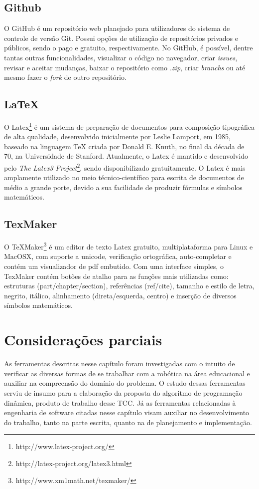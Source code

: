 \subsection{Github}
O GitHub é um repositório web planejado para utilizadores do sistema de controle de versão Git. Possui opções de utilização de repositórios privados e públicos, sendo o pago e gratuito, respectivamente.
No GitHub, é possível, dentre tantas outras funcionalidades, visualizar o código no navegador, criar \textit{issues}, revisar e aceitar mudanças, baixar o repositório como \textit{.zip}, criar \textit{branchs} ou até mesmo fazer o \textit{fork} de outro repositório.

\subsection{LaTeX}
O Latex\footnote{http://www.latex-project.org/} é um sistema de preparação de documentos para composição tipográfica de alta qualidade, desenvolvido inicialmente por Leslie Lamport, em 1985, baseado na linguagem TeX criada por Donald E. Knuth, no final da década de 70, na Universidade de Stanford. Atualmente, o Latex é mantido e desenvolvido pelo \textit{The Latex3 Project}\footnote{http://latex-project.org/latex3.html}, sendo disponibilizado gratuitamente.
O Latex é mais amplamente utilizado no meio técnico-científico para escrita de documentos de médio a grande porte, devido a sua facilidade de produzir fórmulas e símbolos matemáticos. 

\subsection{TexMaker}
O TeXMaker\footnote{http://www.xm1math.net/texmaker/} é um editor de texto Latex gratuito, multiplataforma para Linux e MacOSX, com suporte a unicode, verificação ortográfica, auto-completar e contém um visualizador de pdf embutido.
Com uma interface simples, o TexMaker contém botões de atalho para as funções mais utilizadas como: estruturas (part/chapter/section), referências (ref/cite), tamanho e estilo de letra, negrito, itálico, alinhamento (direta/esquerda, centro) e inserção de diversos símbolos matemáticos.

\section{Considerações parciais}
As ferramentas descritas nesse capítulo foram investigadas com o intuito de verificar as diversas formas de se trabalhar com a robótica na área educacional e auxiliar na compreensão do domínio do problema. O estudo dessas ferramentas serviu de insumo para a elaboração da proposta do algoritmo de programação dinâmica, produto de trabalho desse TCC. Já as ferramentas relacionadas à engenharia de software citadas nesse capítulo visam auxiliar no desenvolvimento do trabalho, tanto na parte escrita, quanto na de planejamento e implementação.